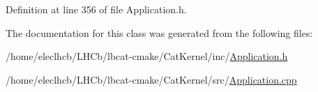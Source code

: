 Definition at line 356 of file Application.\+h.



The documentation for this class was generated from the following files\+:\begin{DoxyCompactItemize}
\item 
/home/eleclhcb/\+L\+H\+Cb/lbcat-\/cmake/\+Cat\+Kernel/inc/\hyperlink{Application_8h}{Application.\+h}\item 
/home/eleclhcb/\+L\+H\+Cb/lbcat-\/cmake/\+Cat\+Kernel/src/\hyperlink{Application_8cpp}{Application.\+cpp}\end{DoxyCompactItemize}
